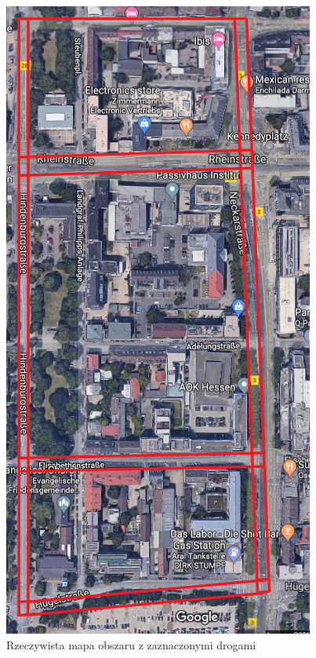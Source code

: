 \documentclass[a4paper,12pt]{article}
\begin{document}
\begin{figure}[!htb]
    \centering
    \captionsetup{justification=centering}
   \begin{minipage}{0.48\textwidth}
     \centering
     \includegraphics[width=.6\linewidth]{marked_map.png}
     \caption{Rzeczywista mapa obszaru z zaznaczonymi drogami}\label{fig:marked_map}
   \end{minipage}\hfill
   \begin{minipage}{0.48\textwidth}
     \centering

\end{minipage}
\end{figure}
\end{document}

